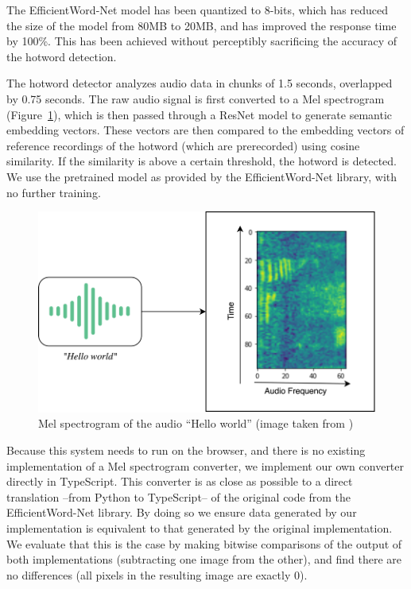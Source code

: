 \documentclass[a4paper,12pt,twoside]{ThesisStyle}
\begin{document}
The EfficientWord-Net model has been quantized to 8-bits, which has reduced the size of the model from 80MB to 20MB, and has improved the response time by 100\%. This has been achieved without perceptibly sacrificing the accuracy of the hotword detection.

The hotword detector analyzes audio data in chunks of 1.5 seconds, overlapped by 0.75 seconds. The raw audio signal is first converted to a Mel spectrogram (Figure~\ref{fig:mel_spectrogram}), which is then passed through a ResNet \cite{He2015DeepResidualLearningImage} model to generate semantic embedding vectors. These vectors are then compared to the embedding vectors of reference recordings of the hotword (which are prerecorded) using cosine similarity. If the similarity is above a certain threshold, the hotword is detected.
We use the pretrained model as provided by the EfficientWord-Net library, with no further training.

\begin{figure}[htb]
  \centering
  \includegraphics[width=1\textwidth]{imatges/MelSpectrogram.png}
  \caption{Mel spectrogram of the audio ``Hello world'' (image taken from \cite{Chidhambararajan2022EfficientWordNet})}
  \label{fig:mel_spectrogram}
\end{figure}

Because this system needs to run on the browser, and there is no existing implementation of a Mel spectrogram converter, we implement our own converter directly in TypeScript. This converter is as close as possible to a direct translation --from Python to TypeScript-- of the original code from the EfficientWord-Net library. By doing so we ensure data generated by our implementation is equivalent to that generated by the original implementation. We evaluate that this is the case by making bitwise comparisons of the output of both implementations (subtracting one image from the other), and find there are no differences (all pixels in the resulting image are exactly 0).
\end{document}
